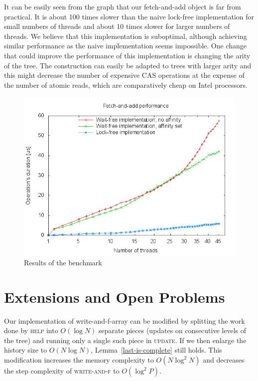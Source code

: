\documentclass[a4paper,11pt]{article}
\newcommand{\fn}[1]{\textsc{#1}}
\begin{document}
It can be easily seen from the graph that our fetch-and-add object is far from practical. It is about 100 times slower than the naive lock-free implementation for small numbers of threads and about 10 times slower
for larger numbers of threads. We believe that this implementation is suboptimal, although achieving similar performance as the naive implementation seems impossible. One change that could improve the performance
of this implementation is changing the arity of the tree. The construction can easily be adapted to trees with larger arity and this might decrease the number of expensive CAS operations at the expense of the number
of atomic reads, which are comparatively cheap on Intel processors.

\begin{figure}
\includegraphics{meas.png}
\caption{Results of the benchmark}
\label{fig-meas}
\end{figure}

\section{Extensions and Open Problems}

Our implementation of write-and-f-array can be modified by splitting the work done by \fn{help} into $O(\log N)$ separate pieces (updates on consecutive levels of the tree) and running only a single such piece in \fn{update}.
If we then enlarge the history size to $O(N\log N)$, Lemma~\ref{last-is-complete} still holds. This modification increases the memory complexity to $O(N\log^2N)$ and decreases the step complexity of
\fn{write-and-f} to $O(\log^2P)$.
\end{document}
